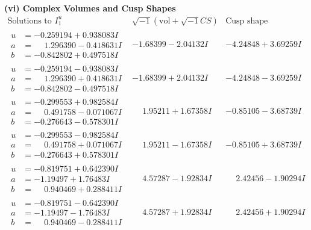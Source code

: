 \documentclass[1p]{elsarticle_modified}
\theoremstyle{definition}
\newcommand{\I}{\sqrt{-1}}
\begin{document}
\newpage\flushleft \textbf{(vi) Complex Volumes and Cusp Shapes}
$$\begin{array}{c|c|c}  
\text{Solutions to }I^u_{1}& \I (\text{vol} + \sqrt{-1}CS) & \text{Cusp shape}\\
 \hline 
\begin{aligned}
u &= -0.259194 + 0.938083 I \\
a &= \phantom{-}1.296390 - 0.418631 I \\
b &= -0.842802 + 0.497518 I\end{aligned}
 & -1.68399 - 2.04132 I & -4.24848 + 3.69259 I \\ \hline\begin{aligned}
u &= -0.259194 - 0.938083 I \\
a &= \phantom{-}1.296390 + 0.418631 I \\
b &= -0.842802 - 0.497518 I\end{aligned}
 & -1.68399 + 2.04132 I & -4.24848 - 3.69259 I \\ \hline\begin{aligned}
u &= -0.299553 + 0.982584 I \\
a &= \phantom{-}0.491758 - 0.071067 I \\
b &= -0.276643 - 0.578301 I\end{aligned}
 & \phantom{-}1.95211 + 1.67358 I & -0.85105 - 3.68739 I \\ \hline\begin{aligned}
u &= -0.299553 - 0.982584 I \\
a &= \phantom{-}0.491758 + 0.071067 I \\
b &= -0.276643 + 0.578301 I\end{aligned}
 & \phantom{-}1.95211 - 1.67358 I & -0.85105 + 3.68739 I \\ \hline\begin{aligned}
u &= -0.819751 + 0.642390 I \\
a &= -1.19497 + 1.76483 I \\
b &= \phantom{-}0.940469 + 0.288411 I\end{aligned}
 & \phantom{-}4.57287 - 1.92834 I & \phantom{-}2.42456 - 1.90294 I \\ \hline\begin{aligned}
u &= -0.819751 - 0.642390 I \\
a &= -1.19497 - 1.76483 I \\
b &= \phantom{-}0.940469 - 0.288411 I\end{aligned}
 & \phantom{-}4.57287 + 1.92834 I & \phantom{-}2.42456 + 1.90294 I \\ \hline\begin{aligned}

\end{aligned}
\end{array}$$
\end{document}

